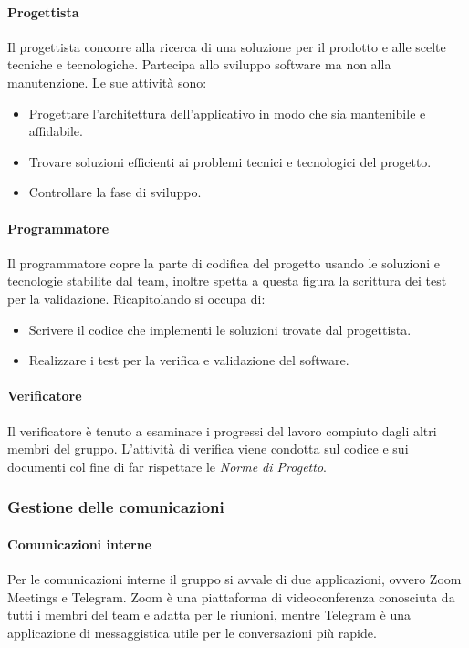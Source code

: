 \paragraph{Progettista}
Il progettista concorre alla ricerca di una soluzione per il prodotto e alle scelte tecniche e tecnologiche.
Partecipa allo sviluppo software ma non alla manutenzione. Le sue attività sono:
\begin{itemize}
    \item Progettare l'architettura dell'applicativo in modo che sia mantenibile e affidabile.
    \item Trovare soluzioni efficienti ai problemi tecnici e tecnologici del progetto.
    \item Controllare la fase di sviluppo.
\end{itemize}

\paragraph{Programmatore}
Il programmatore copre la parte di codifica del progetto usando le soluzioni e tecnologie stabilite dal team, inoltre
spetta a questa figura la scrittura dei test per la validazione. Ricapitolando si occupa di:
\begin{itemize}
    \item Scrivere il codice che implementi le soluzioni trovate dal progettista.
    \item Realizzare i test per la verifica e validazione del software.
\end{itemize}

\paragraph{Verificatore}
Il verificatore è tenuto a esaminare i progressi del lavoro compiuto dagli altri membri del gruppo.   
L'attività di verifica viene condotta sul codice e sui documenti col fine di far rispettare le \emph{Norme di Progetto}.

\subsubsection{Gestione delle comunicazioni}
\paragraph{Comunicazioni interne}
Per le comunicazioni interne il gruppo si avvale di due applicazioni, ovvero Zoom Meetings e Telegram.
Zoom è una piattaforma di videoconferenza conosciuta da tutti i membri del team e adatta per le riunioni, mentre Telegram
è una applicazione di messaggistica utile per le conversazioni più rapide.

